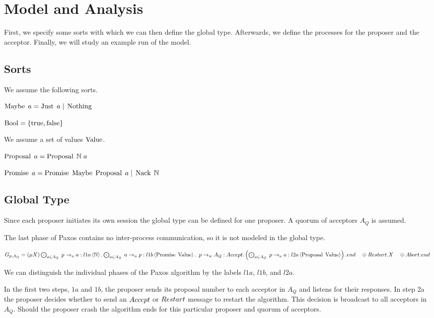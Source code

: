 \chapter{Model and Analysis}
First, we specify some sorts with which we can then define the global type.
Afterwards, we define the processes for the proposer and the acceptor.
Finally, we will study an example run of the model.

\section{Sorts}
We assume the following sorts.

$\operatorname{Maybe}\; a = \operatorname{Just}\; a \; | \; \operatorname{Nothing}$

$\operatorname{Bool} = \left\{\operatorname{true}, \operatorname{false}\right\}$

We assume a set of values $\operatorname{Value}$.

$\operatorname{Proposal}\; a = \operatorname{Proposal}\; \mathbb{N}\; a$

$\operatorname{Promise}\; a = \operatorname{Promise}\; \operatorname{Maybe}\; \operatorname{Proposal}\; a \; | \; \operatorname{Nack}\; \mathbb{N}$

\section{Global Type}
Since each proposer initiates its own session the global type can be defined for one proposer.
A quorum of acceptors $A_Q$ is assumed.

The last phase of Paxos contains no inter-process communication, so it is not modeled in the global type.

$G_{p, A_Q} = \left(\mu X\right) \bigodot_{a \in A_Q}\; p \to_u a : l1a \left\langle \mathbb{N} \right\rangle . \bigodot_{a \in A_Q}\; a \to_u p : l1b \left\langle \operatorname{Promise}\; \operatorname{Value} \right\rangle .\\
\hspace*{0.5em}p \to_w A_Q : \mathnormal{Accept}.\left(\bigodot_{a \in A_Q}\; p \to_u a : l2a \left\langle \operatorname{Proposal}\; \operatorname{Value} \right\rangle\right).end\\
\hspace*{1em}\oplus \mathnormal{Restart}.X\\
\hspace*{1em}\oplus \mathnormal{Abort}.end$

We can distinguish the individual phases of the Paxos algorithm by the labels $l1a$, $l1b$, and $l2a$.

In the first two steps, $1a$ and $1b$, the proposer sends its proposal number to each acceptor in $A_Q$ and listens for their responses.
In step 2a the proposer decides whether to send an $\mathnormal{Accept}$ or $\mathnormal{Restart}$ message to restart the algorithm.
This decision is broadcast to all acceptors in $A_Q$.
Should the proposer crash the algorithm ends for this particular proposer and quorum of acceptors.

